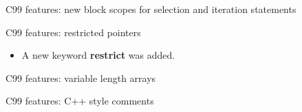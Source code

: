 \begin{frame}{C99 features: new block scopes for selection and iteration statements}
    
\end{frame}
\begin{frame}{C99 features: restricted pointers}
    \begin{itemize}
        \item A new keyword \textbf{restrict} was added.
        
    \end{itemize}
\end{frame}
\begin{frame}{C99 features: variable length arrays}
\end{frame}
\begin{frame}{C99 features:  C++ style comments}
    
\end{frame}

